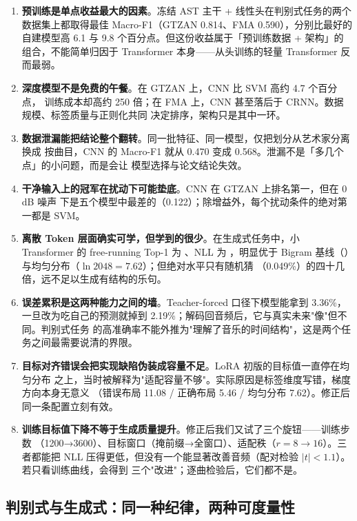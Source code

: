 \documentclass[UTF8,10pt,a4paper]{ctexart}
\begin{document}
\begin{enumerate}
  \item \textbf{预训练是单点收益最大的因素}。冻结 AST 主干 + 线性头在判别式任务的两个
  数据集上都取得最佳 Macro-F1（GTZAN 0.814、FMA 0.590），分别比最好的自建模型高 6.1 与
  9.8 个百分点。但这份收益属于「预训练数据 + 架构」的组合，不能简单归因于 Transformer
  本身——从头训练的轻量 Transformer 反而最弱。
  \item \textbf{深度模型不是免费的午餐}。在 GTZAN 上，CNN 比 SVM 高约 4.7 个百分点，
  训练成本却高约 250 倍；在 FMA 上，CNN 甚至落后于 CRNN。数据规模、标签质量与正则化共同
  决定排序，架构只是其中一环。
  \item \textbf{数据泄漏能把结论整个翻转}。同一批特征、同一模型，仅把划分从艺术家分离换成
  按曲目，CNN 的 Macro-F1 就从 0.470 变成 0.568。泄漏不是「多几个点」的小问题，而是会让
  模型选择与论文结论失效。
  \item \textbf{干净输入上的冠军在扰动下可能垫底}。CNN 在 GTZAN 上排名第一，但在 0\,dB 噪声
  下是五个模型中最差的（0.122）；除增益外，每个扰动条件的绝对第一都是 SVM。
  \item \textbf{离散 Token 层面确实可学，但学到的很少}。在生成式任务中，小 Transformer 的
  free-running Top-1 为 \TokTransformerFree{}、NLL 为 \TokTransformerNll{}，明显优于
  Bigram 基线（\TokBigramFree{}）与均匀分布（$\ln 2048=7.62$）；但绝对水平只有随机猜
  （0.049\%）的四十几倍，远不足以生成有结构的乐句。
  \item \textbf{误差累积是这两种能力之间的墙}。Teacher-forced 口径下模型能拿到 3.36\%，
  一旦改为吃自己的预测就掉到 2.19\%；解码回音频后，它与真实未来"像"但不同。判别式任务
  的高准确率不能外推为"理解了音乐的时间结构"，这是两个任务之间最需要说清的界限。
  \item \textbf{目标对齐错误会把实现缺陷伪装成容量不足}。LoRA 初版的目标值一直停在均匀分布
  之上，当时被解释为"适配容量不够"。实际原因是标签维度写错，梯度方向本身无意义
  （错误布局 11.08 / 正确布局 5.46 / 均匀分布 7.62）。修正后同一条配置立刻有效。
  \item \textbf{训练目标值下降不等于生成质量提升}。修正后我们又试了三个旋钮——训练步数
  （1200→3600）、目标窗口（掩前缀→全窗口）、适配秩（$r{=}8\!\to\!16$）。三者都能把
  NLL 压得更低，但没有一个能显著改善音频（配对检验 $|t|<1.1$）。若只看训练曲线，会得到
  三个"改进"；逐曲检验后，它们都不是。
\end{enumerate}

\subsection{判别式与生成式：同一种纪律，两种可度量性}\label{sec:twometric}
\end{document}

